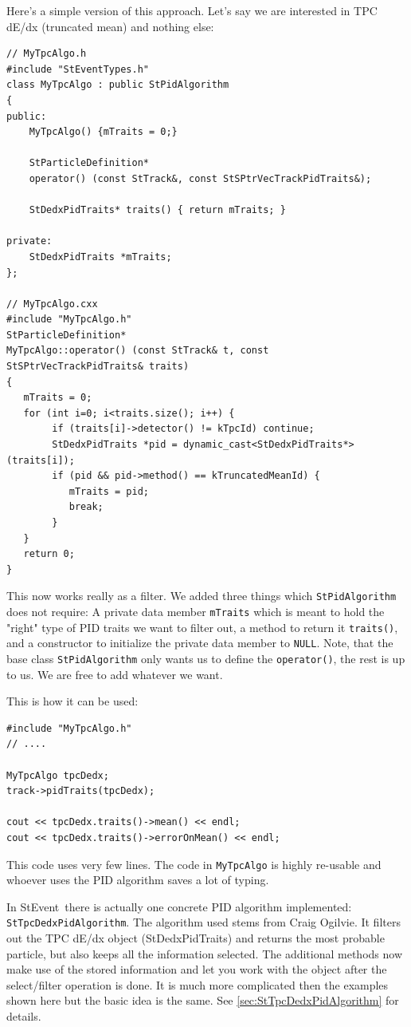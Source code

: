 \documentclass[twoside]{article}
\newcommand{\StEvent}{\textsf{StEvent}}
\begin{document}
Here's a simple version of this approach. Let's say we are interested
in TPC dE/dx (truncated mean) and nothing else:
\begin{verbatim}
// MyTpcAlgo.h
#include "StEventTypes.h"
class MyTpcAlgo : public StPidAlgorithm
{
public:
    MyTpcAlgo() {mTraits = 0;}

    StParticleDefinition*
    operator() (const StTrack&, const StSPtrVecTrackPidTraits&);

    StDedxPidTraits* traits() { return mTraits; }

private:
    StDedxPidTraits *mTraits;
};

// MyTpcAlgo.cxx
#include "MyTpcAlgo.h"
StParticleDefinition*
MyTpcAlgo::operator() (const StTrack& t, const StSPtrVecTrackPidTraits& traits)
{
   mTraits = 0;
   for (int i=0; i<traits.size(); i++) {
        if (traits[i]->detector() != kTpcId) continue;
        StDedxPidTraits *pid = dynamic_cast<StDedxPidTraits*>(traits[i]);
        if (pid && pid->method() == kTruncatedMeanId) {
           mTraits = pid;
           break;
        }
   }
   return 0;
}
\end{verbatim}

This now works really as a filter. We added three things which
\texttt{StPidAlgorithm} does not require: A private data member
\texttt{mTraits} which is meant to hold the "right" type of PID traits
we want to filter out, a method to return it \texttt{traits()}, and a
constructor to initialize the private data member to \texttt{NULL}.
Note, that the base class \texttt{StPidAlgorithm} only wants us to
define the \texttt{operator()}, the rest is up to us. We are free to
add whatever we want.

This is how it can be used:
\begin{verbatim}
#include "MyTpcAlgo.h"
// ....

MyTpcAlgo tpcDedx;
track->pidTraits(tpcDedx);

cout << tpcDedx.traits()->mean() << endl;
cout << tpcDedx.traits()->errorOnMean() << endl;
\end{verbatim}

This code uses very few lines. The code in \texttt{MyTpcAlgo} is
highly re-usable and whoever uses the PID algorithm saves a lot of
typing.

 In \StEvent\ there is actually one
concrete PID algorithm implemented: \texttt{StTpcDedxPidAlgorithm}.
The algorithm used stems from Craig Ogilvie.  It filters out the TPC
dE/dx object (StDedxPidTraits) and returns the most probable particle,
but also keeps all the information selected. The additional methods
now make use of the stored information and let you work with the
object after the select/filter operation is done. It is much more
complicated then the examples shown here but the basic idea is the
same. See \ref{sec:StTpcDedxPidAlgorithm} for details.
\end{document}
